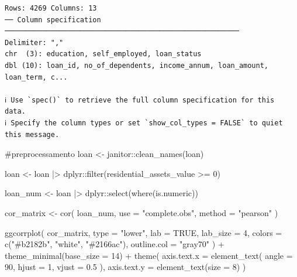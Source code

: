\documentclass[
  letterpaper,
  DIV=11,
  numbers=noendperiod]{scrartcl}
\newenvironment{Shaded}{\begin{snugshade}}{\end{snugshade}}
\newcommand{\AttributeTok}[1]{\textcolor[rgb]{0.40,0.45,0.13}{#1}}
\newcommand{\CommentTok}[1]{\textcolor[rgb]{0.37,0.37,0.37}{#1}}
\newcommand{\ConstantTok}[1]{\textcolor[rgb]{0.56,0.35,0.01}{#1}}
\newcommand{\DecValTok}[1]{\textcolor[rgb]{0.68,0.00,0.00}{#1}}
\newcommand{\FloatTok}[1]{\textcolor[rgb]{0.68,0.00,0.00}{#1}}
\newcommand{\FunctionTok}[1]{\textcolor[rgb]{0.28,0.35,0.67}{#1}}
\newcommand{\NormalTok}[1]{\textcolor[rgb]{0.00,0.23,0.31}{#1}}
\newcommand{\OtherTok}[1]{\textcolor[rgb]{0.00,0.23,0.31}{#1}}
\newcommand{\SpecialCharTok}[1]{\textcolor[rgb]{0.37,0.37,0.37}{#1}}
\newcommand{\StringTok}[1]{\textcolor[rgb]{0.13,0.47,0.30}{#1}}
\begin{document}
\begin{verbatim}
Rows: 4269 Columns: 13
── Column specification ────────────────────────────────────────────────────────
Delimiter: ","
chr  (3): education, self_employed, loan_status
dbl (10): loan_id, no_of_dependents, income_annum, loan_amount, loan_term, c...

ℹ Use `spec()` to retrieve the full column specification for this data.
ℹ Specify the column types or set `show_col_types = FALSE` to quiet this message.
\end{verbatim}

\begin{Shaded}
\begin{Highlighting}[]
\CommentTok{\#preprocessamento}
\NormalTok{loan }\OtherTok{\textless{}{-}}\NormalTok{ janitor}\SpecialCharTok{::}\FunctionTok{clean\_names}\NormalTok{(loan)}

\NormalTok{loan }\OtherTok{\textless{}{-}}\NormalTok{ loan }\SpecialCharTok{|\textgreater{}}
\NormalTok{  dplyr}\SpecialCharTok{::}\FunctionTok{filter}\NormalTok{(residential\_assets\_value }\SpecialCharTok{\textgreater{}=} \DecValTok{0}\NormalTok{)}
\end{Highlighting}
\end{Shaded}

\begin{Shaded}
\begin{Highlighting}[]
\NormalTok{loan\_num }\OtherTok{\textless{}{-}}\NormalTok{ loan }\SpecialCharTok{|\textgreater{}}
\NormalTok{  dplyr}\SpecialCharTok{::}\FunctionTok{select}\NormalTok{(}\FunctionTok{where}\NormalTok{(is.numeric))}

\NormalTok{cor\_matrix }\OtherTok{\textless{}{-}} \FunctionTok{cor}\NormalTok{(}
\NormalTok{  loan\_num,}
  \AttributeTok{use =} \StringTok{"complete.obs"}\NormalTok{,}
  \AttributeTok{method =} \StringTok{"pearson"}
\NormalTok{)}

\FunctionTok{ggcorrplot}\NormalTok{(}
\NormalTok{  cor\_matrix,}
  \AttributeTok{type =} \StringTok{"lower"}\NormalTok{,}
  \AttributeTok{lab =} \ConstantTok{TRUE}\NormalTok{,}
  \AttributeTok{lab\_size =} \DecValTok{4}\NormalTok{,}
  \AttributeTok{colors =} \FunctionTok{c}\NormalTok{(}\StringTok{"\#b2182b"}\NormalTok{, }\StringTok{"white"}\NormalTok{, }\StringTok{"\#2166ac"}\NormalTok{),}
  \AttributeTok{outline.col =} \StringTok{"gray70"}
\NormalTok{) }\SpecialCharTok{+}
  \FunctionTok{theme\_minimal}\NormalTok{(}\AttributeTok{base\_size =} \DecValTok{14}\NormalTok{) }\SpecialCharTok{+}
  \FunctionTok{theme}\NormalTok{(}
    \AttributeTok{axis.text.x =} \FunctionTok{element\_text}\NormalTok{(}
      \AttributeTok{angle =} \DecValTok{90}\NormalTok{,}
      \AttributeTok{hjust =} \DecValTok{1}\NormalTok{,}
      \AttributeTok{vjust =} \FloatTok{0.5}
\NormalTok{    ),}
    \AttributeTok{axis.text.y =} \FunctionTok{element\_text}\NormalTok{(}\AttributeTok{size =} \DecValTok{8}\NormalTok{)}
\NormalTok{  )}
\end{Highlighting}
\end{Shaded}
\end{document}
